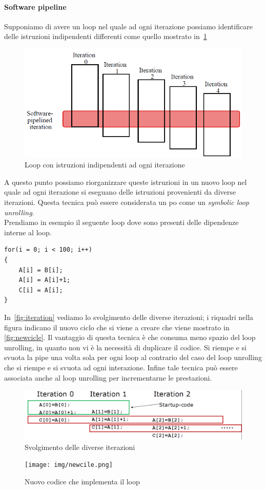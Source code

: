 \paragraph{Software pipeline}
Supponiamo di avere un loop nel quale ad ogni iterazione possiamo identificare delle istruzioni indipendenti differenti come quello mostrato in \figurename\,\ref{fig:swpipe}
\begin{figure}[htb]
\centering
\includegraphics[scale=0.5]{img/swpipe.png}
\caption{Loop con istruzioni indipendenti ad ogni iterazione}\label{fig:swpipe}
\end{figure}
A questo punto possiamo riorganizzare queste istruzioni in un nuovo loop nel quale ad ogni iterazione si eseguano delle istruzioni provenienti da diverse iterazioni.
Questa tecnica può essere considerata un po come un \emph{symbolic loop unrolling}.\\
Prendiamo in esempio il seguente loop dove sono presenti delle dipendenze interne al loop.
\begin{verbatim}
for(i = 0; i < 100; i++)
{
	A[i] = B[i];
	A[i] = A[i]+1;
	C[i] = A[i];
}
\end{verbatim}
In \figurename\,\ref{fig:iteration} vediamo lo svolgimento delle diverse iterazioni; i riquadri nella figura indicano il nuovo ciclo che si viene a creare che viene mostrato in \figurename\,\ref{fig:newcicle}. Il vantaggio di questa tecnica è che consuma meno spazio del loop unrolling, in quanto non vi è la necessità di duplicare il codice. Si riempe e si svuota la pipe una volta sola per ogni loop al contrario del caso del loop unrolling che si riempe e si svuota ad ogni interazione. Infine tale tecnica può essere associata anche al loop unrolling per incrementarne le prestazioni.
\begin{figure}[htb]
\centering
\includegraphics[scale=0.5]{img/iteration.png}
\caption{Svolgimento delle diverse iterazioni}\label{fig:iterazioni}
\end{figure}
\begin{figure}[htb]
\centering
\texttt{[image: img/newcile.png]}
\caption{Nuovo codice che implementa il loop}\label{fig:newcile}
\end{figure}
